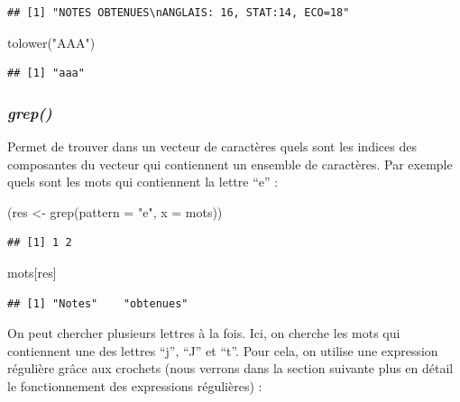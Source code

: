 \documentclass[
]{book}
\newenvironment{Shaded}{\begin{snugshade}}{\end{snugshade}}
\newcommand{\AttributeTok}[1]{\textcolor[rgb]{0.77,0.63,0.00}{#1}}
\newcommand{\FunctionTok}[1]{\textcolor[rgb]{0.00,0.00,0.00}{#1}}
\newcommand{\NormalTok}[1]{#1}
\newcommand{\OtherTok}[1]{\textcolor[rgb]{0.56,0.35,0.01}{#1}}
\newcommand{\StringTok}[1]{\textcolor[rgb]{0.31,0.60,0.02}{#1}}
\theoremstyle{definition}
\theoremstyle{definition}
\theoremstyle{definition}
\theoremstyle{definition}
\theoremstyle{remark}
\begin{document}
\begin{verbatim}
## [1] "NOTES OBTENUES\nANGLAIS: 16, STAT:14, ECO=18"
\end{verbatim}

\begin{Shaded}
\begin{Highlighting}[]
\FunctionTok{tolower}\NormalTok{(}\StringTok{"AAA"}\NormalTok{)}
\end{Highlighting}
\end{Shaded}

\begin{verbatim}
## [1] "aaa"
\end{verbatim}

\hypertarget{grep}{%
\subsubsection{\texorpdfstring{\emph{grep()}}{grep()}}\label{grep}}

Permet de trouver dans un vecteur de caractères quels sont les indices des composantes du vecteur qui contiennent un ensemble de caractères. Par exemple quels sont les mots qui contiennent la lettre ``e'' :

\begin{Shaded}
\begin{Highlighting}[]
\NormalTok{(res }\OtherTok{\textless{}{-}} \FunctionTok{grep}\NormalTok{(}\AttributeTok{pattern =} \StringTok{"e"}\NormalTok{, }\AttributeTok{x =}\NormalTok{ mots))}
\end{Highlighting}
\end{Shaded}

\begin{verbatim}
## [1] 1 2
\end{verbatim}

\begin{Shaded}
\begin{Highlighting}[]
\NormalTok{mots[res]}
\end{Highlighting}
\end{Shaded}

\begin{verbatim}
## [1] "Notes"    "obtenues"
\end{verbatim}

On peut chercher plusieurs lettres à la fois. Ici, on cherche les mots qui contiennent une des lettres ``j'', ``J'' et ``t''. Pour cela, on utilise une expression régulière grâce aux crochets (nous verrons dans la section suivante plus en détail le fonctionnement des expressions régulières) :
\end{document}
